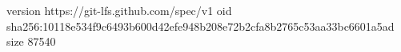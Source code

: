 version https://git-lfs.github.com/spec/v1
oid sha256:10118e534f9c6493b600d42efe948b208e72b2cfa8b2765c53aa33bc6601a5ad
size 87540
